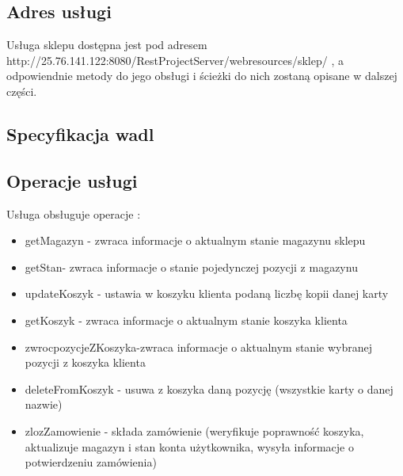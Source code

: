 \documentclass[11pt]{article}   %
\begin{document}
	\subsection{Adres usługi}
	Usługa sklepu dostępna jest pod adresem \newline http://25.76.141.122:8080/RestProjectServer/webresources/sklep/ , a odpowiendnie metody do jego obsługi i ścieżki do nich zostaną opisane w dalszej części.
	\subsection{Specyfikacja wadl}

\subsection{Operacje usługi}
Usługa obsługuje operacje :
\begin{itemize}
	\item getMagazyn - zwraca informacje o aktualnym stanie magazynu sklepu
	\item getStan- zwraca informacje o stanie pojedynczej pozycji z magazynu
	\item updateKoszyk - ustawia w koszyku klienta podaną liczbę kopii danej karty
	\item getKoszyk - zwraca informacje o aktualnym stanie koszyka klienta
	\item zwrocpozycjeZKoszyka-zwraca informacje o aktualnym stanie wybranej pozycji z koszyka klienta
	\item deleteFromKoszyk - usuwa z koszyka daną pozycję (wszystkie karty o danej nazwie)
	\item zlozZamowienie - składa zamówienie (weryfikuje poprawność koszyka, aktualizuje magazyn i stan konta użytkownika, wysyła informacje o potwierdzeniu zamówienia)
\end{itemize}
\end{document}
